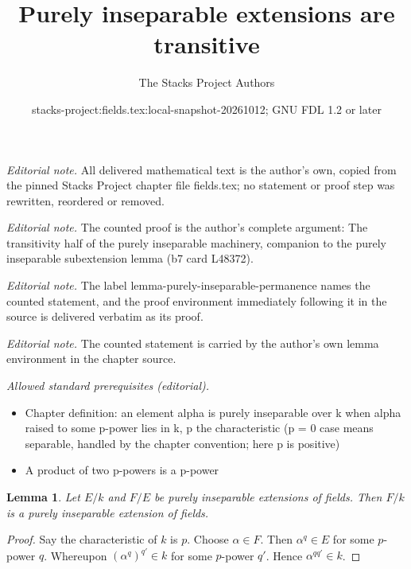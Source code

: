 \documentclass[10pt,a4paper]{amsart}
\title{Purely inseparable extensions are transitive}
\author{The Stacks Project Authors}
\date{stacks-project:fields.tex:local-snapshot-20261012; GNU FDL 1.2 or later}
\theoremstyle{plain}
\newtheorem{lemma}[subsection]{Lemma}
\theoremstyle{definition}
\theoremstyle{remark}
\numberwithin{equation}{subsection}
\begin{document}
\maketitle
\noindent\textit{Editorial note.} All delivered mathematical text is the author's own, copied from the pinned Stacks Project chapter file fields.tex; no statement or proof step was rewritten, reordered or removed.\par\medskip
\noindent\textit{Editorial note.} The counted proof is the author's complete argument: The transitivity half of the purely inseparable machinery, companion to the purely inseparable subextension lemma (b7 card L48372).\par\medskip
\noindent\textit{Editorial note.} The label lemma-purely-inseparable-permanence names the counted statement, and the proof environment immediately following it in the source is delivered verbatim as its proof.\par\medskip
\noindent\textit{Editorial note.} The counted statement is carried by the author's own lemma environment in the chapter source.\par\medskip
\noindent\textit{Allowed standard prerequisites (editorial).}\begin{itemize}
\item Chapter definition: an element alpha is purely inseparable over k when alpha raised to some p-power lies in k, p the characteristic (p = 0 case means separable, handled by the chapter convention; here p is positive)
\item A product of two p-powers is a p-power
\end{itemize}\medskip
\begin{lemma}
\label{lemma-purely-inseparable-permanence}
Let $E/k$ and $F/E$ be purely inseparable extensions of fields. Then $F/k$
is a purely inseparable extension of fields.
\end{lemma}

\begin{proof}
Say the characteristic of $k$ is $p$. Choose $\alpha \in F$. Then
$\alpha^q \in E$ for some $p$-power $q$. Whereupon $(\alpha^q)^{q'} \in k$
for some $p$-power $q'$. Hence $\alpha^{qq'} \in k$.
\end{proof}
\end{document}
